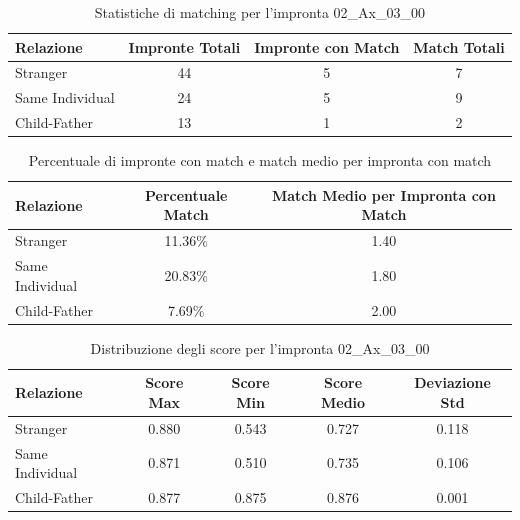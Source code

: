 \begin{table}[htbp]
\centering
\caption{Statistiche di matching per l'impronta 02\_Ax\_03\_00}
\label{tab:results_02_Ax_03_00}
\begin{tabular}{|l|c|c|c|}
\hline
\textbf{Relazione} & \textbf{Impronte Totali} & \textbf{Impronte con Match} & \textbf{Match Totali} \\
\hline
Stranger & 44 & 5 & 7 \\
\hline
Same Individual & 24 & 5 & 9 \\
\hline
Child-Father & 13 & 1 & 2 \\
\hline
\end{tabular}
\end{table}


\begin{table}[htbp]
\centering
\caption{Percentuale di impronte con match e match medio per impronta con match}
\label{tab:match_percentage_02_Ax_03_00}
\begin{tabular}{|l|c|c|}
\hline
\textbf{Relazione} & \textbf{Percentuale Match} & \textbf{Match Medio per Impronta con Match} \\
\hline
Stranger & 11.36\% & 1.40 \\
\hline
Same Individual & 20.83\% & 1.80 \\
\hline
Child-Father & 7.69\% & 2.00 \\
\hline
\end{tabular}
\end{table}


\begin{table}[htbp]
\centering
\caption{Distribuzione degli score per l'impronta 02\_Ax\_03\_00}
\label{tab:scores_02_Ax_03_00}
\begin{tabular}{|l|c|c|c|c|}
\hline
\textbf{Relazione} & \textbf{Score Max} & \textbf{Score Min} & \textbf{Score Medio} & \textbf{Deviazione Std} \\
\hline
Stranger & 0.880 & 0.543 & 0.727 & 0.118 \\
\hline
Same Individual & 0.871 & 0.510 & 0.735 & 0.106 \\
\hline
Child-Father & 0.877 & 0.875 & 0.876 & 0.001 \\
\hline
\end{tabular}
\end{table}

